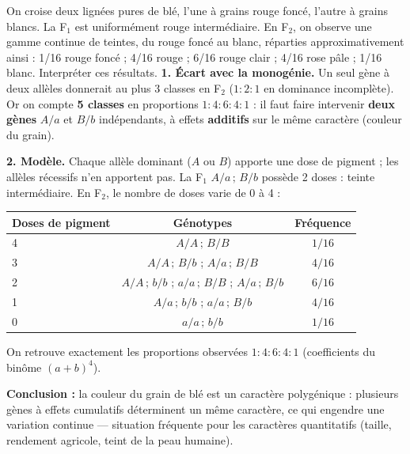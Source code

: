 \documentclass[11pt]{article}
\newcommand{\cle}[1]{{\popxbold\color{popdark}#1}}
\begin{document}
\begin{exoresolu}
On croise deux lignées pures de blé, l'une à grains rouge foncé, l'autre à grains blancs. La F$_1$ est uniformément rouge intermédiaire. En F$_2$, on observe une gamme continue de teintes, du rouge foncé au blanc, réparties approximativement ainsi : 1/16 rouge foncé ; 4/16 rouge ; 6/16 rouge clair ; 4/16 rose pâle ; 1/16 blanc. Interpréter ces résultats.
\tcblower
\textbf{1. Écart avec la monogénie.} Un seul gène à deux allèles donnerait au plus 3 classes en F$_2$ ($1:2:1$ en dominance incomplète). Or on compte \textbf{5 classes} en proportions $1:4:6:4:1$ : il faut faire intervenir \textbf{deux gènes} $A/a$ et $B/b$ indépendants, à effets \textbf{additifs} sur le même caractère (couleur du grain).

\textbf{2. Modèle.} Chaque allèle dominant ($A$ ou $B$) apporte une dose de pigment ; les allèles récessifs n'en apportent pas. La F$_1$ $A/a\,;\,B/b$ possède 2 doses : teinte intermédiaire. En F$_2$, le nombre de doses varie de 0 à 4 :
\begin{center}
\begin{tabular}{|l|c|c|}
\hline
\rowcolor{popblueL} Doses de pigment & Génotypes & Fréquence \\
\hline
4 & $A/A\,;\,B/B$ & $1/16$ \\
\hline
3 & $A/A\,;\,B/b$ ; $A/a\,;\,B/B$ & $4/16$ \\
\hline
2 & $A/A\,;\,b/b$ ; $a/a\,;\,B/B$ ; $A/a\,;\,B/b$ & $6/16$ \\
\hline
1 & $A/a\,;\,b/b$ ; $a/a\,;\,B/b$ & $4/16$ \\
\hline
0 & $a/a\,;\,b/b$ & $1/16$ \\
\hline
\end{tabular}
\end{center}
On retrouve exactement les proportions observées $1:4:6:4:1$ (coefficients du binôme $(a+b)^4$).

\textbf{Conclusion :} la couleur du grain de blé est un caractère \cle{polygénique} : plusieurs gènes à effets cumulatifs déterminent un même caractère, ce qui engendre une variation continue — situation fréquente pour les caractères quantitatifs (taille, rendement agricole, teint de la peau humaine).
\end{exoresolu}
\end{document}

